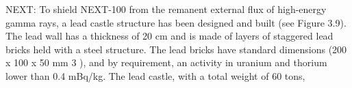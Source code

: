 NEXT:
To shield NEXT-100 from the remanent external flux of high-energy gamma rays, a lead castle structure has been designed and built (see Figure 3.9). The lead wall has a thickness of 20 cm and is made of layers of staggered lead bricks held with a steel structure. The lead bricks have standard dimensions (200 x 100 x 50 mm 3 ), and by requirement, an activity in uranium and thorium lower than 0.4 mBq/kg. The lead castle, with a total weight of 60 tons,
